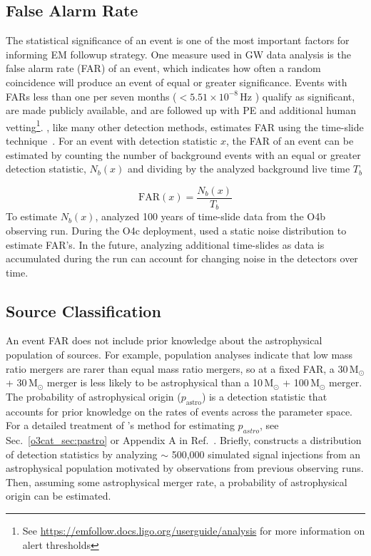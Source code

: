 \begin{refsection}
\subsection{False Alarm Rate}
The statistical significance of an event is one of the most important factors for informing EM followup strategy. 
One measure used in GW data analysis is the false alarm rate (FAR) of an event, which indicates how often a random coincidence will produce an event of equal or greater significance. 
Events with FARs less than one per seven months ($< 5.51 \times 10^{-8}$\,Hz ) qualify as significant, are made publicly available, and are followed up with PE and additional human vetting\footnote{See \url{https://emfollow.docs.ligo.org/userguide/analysis} for more information on alert thresholds}. 
\aframe, like many other detection methods, estimates FAR using the time-slide technique~\cite{Aubin_2021, Dal_Canton_2021}. 
For an event with detection statistic $x$, the FAR of an event can be estimated by counting the number of background events with an equal or greater detection statistic, $N_b(x)$ and dividing by the analyzed background live time $T_b$

\begin{equation}
    \mathrm{FAR}(x) = \frac{N_b(x)}{T_b}
\end{equation}
\noindent
To estimate $N_b(x)$, \aframe analyzed 100 years of time-slide data from the O4b observing run. 
During the O4c deployment, \aframe used a static noise distribution to estimate FAR's. 
In the future, analyzing additional time-slides as data is accumulated during the run can account for changing noise in the detectors over time.


\subsection{Source Classification}
\label{online_sec:source_class}
An event FAR does not include prior knowledge about the astrophysical population of sources. 
For example, population analyses indicate that low mass ratio mergers are rarer than equal mass ratio mergers, so at a fixed FAR, a 30\,$\mathrm{M}_{\odot}$ + 30\,$\mathrm{M}_{\odot}$ merger is less likely to be astrophysical than a 10\,$\mathrm{M}_{\odot}$ + 100\,$\mathrm{M}_{\odot}$ merger. 
The probability of astrophysical origin ($p_{\mathrm{astro}}$) is a detection statistic that accounts for prior knowledge on the rates of events across the parameter space. 
For a detailed treatment of \aframe's method for estimating $p_{astro}$, see Sec.~\ref{o3cat_sec:pastro} or Appendix A in Ref.~\cite{aframe-methods}. 
Briefly, \aframe constructs a distribution of detection statistics by analyzing $\sim$ 500,000 simulated signal injections from an astrophysical population motivated by observations from previous observing runs. 
Then, assuming some astrophysical merger rate, a probability of astrophysical origin can be estimated. 



\end{refsection}
